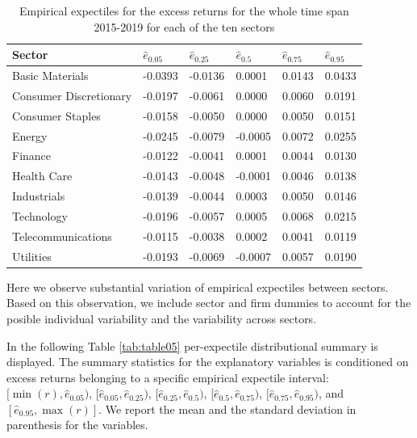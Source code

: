 \documentclass[11pt]{article}
\begin{document}
\begin{table}[h!]

\caption{\label{tab:table04}Empirical expectiles for the excess returns for the whole time span 2015-2019 for each of the ten sectors}
\centering
\begin{tabular}[t]{l|l|l|l|l|l}
\hline
 Sector & $\hat e_{0.05}$ & $\hat e_{0.25}$ & $\hat e_{0.5}$ & $\hat e_{0.75}$ & $\hat e_{0.95}$\\
\hline
Basic Materials & -0.0393 & -0.0136 & 0.0001 & 0.0143 & 0.0433\\
\hline
Consumer Discretionary & -0.0197 & -0.0061 & 0.0000 & 0.0060 & 0.0191\\
\hline
Consumer Staples & -0.0158 & -0.0050 & 0.0000 & 0.0050 & 0.0151\\
\hline
Energy & -0.0245 & -0.0079 & -0.0005 & 0.0072 & 0.0255\\
\hline
Finance & -0.0122 & -0.0041 & 0.0001 & 0.0044 & 0.0130\\
\hline
Health Care & -0.0143 & -0.0048 & -0.0001 & 0.0046 & 0.0138\\
\hline
Industrials & -0.0139 & -0.0044 & 0.0003 & 0.0050 & 0.0146\\
\hline
Technology & -0.0196 & -0.0057 & 0.0005 & 0.0068 & 0.0215\\
\hline
Telecommunications & -0.0115 & -0.0038 & 0.0002 & 0.0041 & 0.0119\\
\hline
Utilities & -0.0193 & -0.0069 & -0.0007 & 0.0057 & 0.0190\\
\hline
\end{tabular}
\end{table}

Here we observe substantial variation of empirical expectiles between sectors. Based on this observation, we include sector and firm dummies to account for the posible individual variability and the variability across sectors.

In the following Table \ref{tab:table05} per-expectile distributional summary is displayed. The summary statistics for the explanatory variables is conditioned on excess returns belonging to a specific empirical expectile interval: \([\min(r), \hat e_{0.05})\), \([\hat e_{0.05}, \hat e_{0.25} )\), \([\hat e_{0.25}, \hat e_{0.5})\), \([\hat e_{0.5}, \hat e_{0.75})\), \([\hat e_{0.75}, \hat e_{0.95})\), and \([\hat e_{0.95}, \max(r)]\). We report the mean and the standard deviation in parenthesis for the variables.
\end{document}
